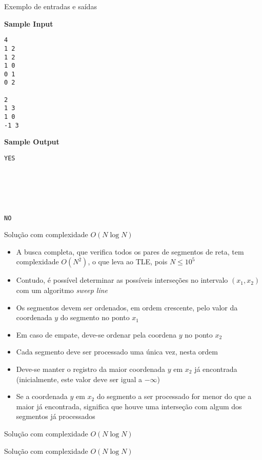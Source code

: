 \begin{frame}[fragile]{Exemplo de entradas e saídas}

\begin{minipage}[t]{0.5\textwidth}
\textbf{Sample Input}
\begin{verbatim}
4
1 2
1 2
1 0
0 1
0 2

2
1 3
1 0
-1 3
\end{verbatim}
\end{minipage}
\begin{minipage}[t]{0.45\textwidth}
\textbf{Sample Output}
\begin{verbatim}
YES






NO
\end{verbatim}
\end{minipage}
\end{frame}

\begin{frame}[fragile]{Solução com complexidade $O(N\log N)$}

    \begin{itemize}
        \item A busca completa, que verifica todos os pares de segmentos de reta, tem
            complexidade $O(N^2)$, o que leva ao TLE, pois $N\leq 10^5$
        \pause

        \item Contudo, é possível determinar as possíveis interseções no intervalo
            $(x_1, x_2)$ com um algoritmo \textit{sweep line} 
        \pause

        \item Os segmentos devem ser ordenados, em ordem crescente, pelo valor da coordenada
            $y$ do segmento no ponto $x_1$
        \pause

        \item Em caso de empate, deve-se ordenar pela coordena $y$ no ponto $x_2$
        \pause

        \item Cada segmento deve ser processado uma única vez, nesta ordem
        \pause

        \item Deve-se manter o registro da maior coordenada $y$ em $x_2$ já encontrada 
            (inicialmente, este valor deve ser igual a $-\infty$)
        \pause

        \item Se a coordenada $y$ em $x_2$ do segmento a ser processado for menor do que
            a maior já encontrada, significa que houve uma interseção com algum dos segmentos
            já processados 
    \end{itemize}

\end{frame}

\begin{frame}[fragile]{Solução com complexidade $O(N \log N)$}
\end{frame}

\begin{frame}[fragile]{Solução com complexidade $O(N \log N)$}
\end{frame}
